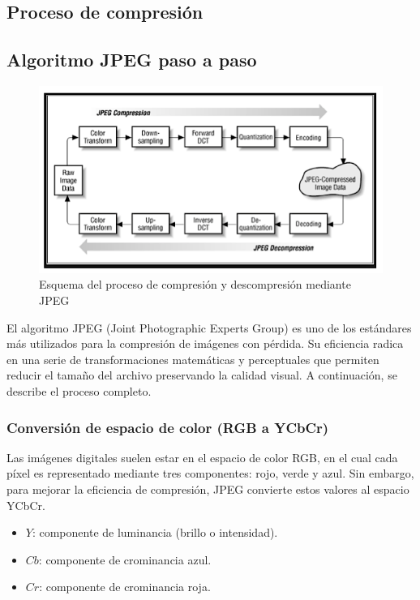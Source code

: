 \documentclass[8pt,a4paper]{article}
\theoremstyle{definition}
\theoremstyle{remark}
\begin{document}
\begin{multicols}{2}
    \begin{center}
    \section{Proceso de compresión}
    \end{center}

        \subsection{Algoritmo JPEG paso a paso}
            \begin{figure}[H]
                \centering
                \includegraphics[width=0.9\linewidth]{esquema.jpg}
                \captionsetup{skip=2pt}
                \caption*{Esquema del proceso de compresión y descompresión mediante JPEG}
            \end{figure}
            El algoritmo JPEG (Joint Photographic Experts Group) es uno de los estándares más utilizados para la compresión de imágenes con pérdida. Su eficiencia radica en una serie de transformaciones matemáticas y perceptuales que permiten reducir el tamaño del archivo preservando la calidad visual. A continuación, se describe el proceso completo.
            
            \subsubsection{Conversión de espacio de color (RGB a YCbCr)}
            
            Las imágenes digitales suelen estar en el espacio de color RGB, en el cual cada píxel es representado mediante tres componentes: rojo, verde y azul. Sin embargo, para mejorar la eficiencia de compresión, JPEG convierte estos valores al espacio YCbCr.
            
            \begin{itemize}
                \item \( Y \): componente de luminancia (brillo o intensidad).
                \item \( Cb \): componente de crominancia azul.
                \item \( Cr \): componente de crominancia roja.
            \end{itemize}
            

\end{multicols}
\end{document}
